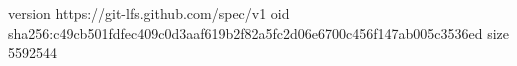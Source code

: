 version https://git-lfs.github.com/spec/v1
oid sha256:c49cb501fdfec409c0d3aaf619b2f82a5fc2d06e6700c456f147ab005c3536ed
size 5592544
